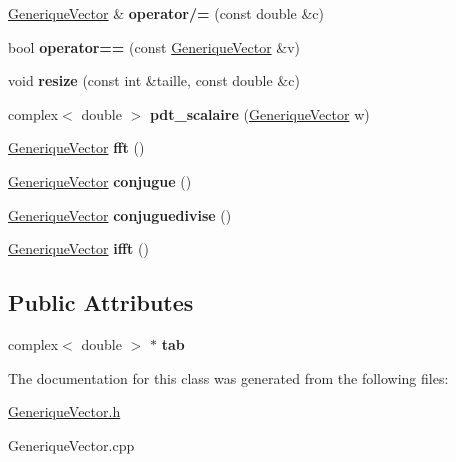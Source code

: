 \begin{DoxyCompactItemize}
\item 
\hypertarget{classGeneriqueVector_ae487b7474cb5799256088c62bfd2ff9a}{\hyperlink{classGeneriqueVector}{Generique\-Vector} \& {\bfseries operator/=} (const double \&c)}\label{classGeneriqueVector_ae487b7474cb5799256088c62bfd2ff9a}

\item 
\hypertarget{classGeneriqueVector_a2fcc04d45c1668fdc6a61dd7c121db35}{bool {\bfseries operator==} (const \hyperlink{classGeneriqueVector}{Generique\-Vector} \&v)}\label{classGeneriqueVector_a2fcc04d45c1668fdc6a61dd7c121db35}

\item 
\hypertarget{classGeneriqueVector_ae560f9529566eed565fa1974522e2066}{void {\bfseries resize} (const int \&taille, const double \&c)}\label{classGeneriqueVector_ae560f9529566eed565fa1974522e2066}

\item 
\hypertarget{classGeneriqueVector_a45bd3db3b6b0db240f8872f0fe9e4ca6}{complex$<$ double $>$ {\bfseries pdt\-\_\-scalaire} (\hyperlink{classGeneriqueVector}{Generique\-Vector} w)}\label{classGeneriqueVector_a45bd3db3b6b0db240f8872f0fe9e4ca6}

\item 
\hypertarget{classGeneriqueVector_a94ff66f0fdf963c8d216012b9f79b238}{\hyperlink{classGeneriqueVector}{Generique\-Vector} {\bfseries fft} ()}\label{classGeneriqueVector_a94ff66f0fdf963c8d216012b9f79b238}

\item 
\hypertarget{classGeneriqueVector_af4ec7d272fec68853cc09bc7cd31303b}{\hyperlink{classGeneriqueVector}{Generique\-Vector} {\bfseries conjugue} ()}\label{classGeneriqueVector_af4ec7d272fec68853cc09bc7cd31303b}

\item 
\hypertarget{classGeneriqueVector_a47ed9d0808cc22d028188f974109f91c}{\hyperlink{classGeneriqueVector}{Generique\-Vector} {\bfseries conjuguedivise} ()}\label{classGeneriqueVector_a47ed9d0808cc22d028188f974109f91c}

\item 
\hypertarget{classGeneriqueVector_a0937bdd38f7b8015ded3c009cee3682c}{\hyperlink{classGeneriqueVector}{Generique\-Vector} {\bfseries ifft} ()}\label{classGeneriqueVector_a0937bdd38f7b8015ded3c009cee3682c}

\end{DoxyCompactItemize}
\subsection*{Public Attributes}
\begin{DoxyCompactItemize}
\item 
\hypertarget{classGeneriqueVector_afa9d183baf347df4930c8a4ce77bbff5}{complex$<$ double $>$ $\ast$ {\bfseries tab}}\label{classGeneriqueVector_afa9d183baf347df4930c8a4ce77bbff5}

\end{DoxyCompactItemize}


The documentation for this class was generated from the following files\-:\begin{DoxyCompactItemize}
\item 
\hyperlink{GeneriqueVector_8h}{Generique\-Vector.\-h}\item 
Generique\-Vector.\-cpp\end{DoxyCompactItemize}
